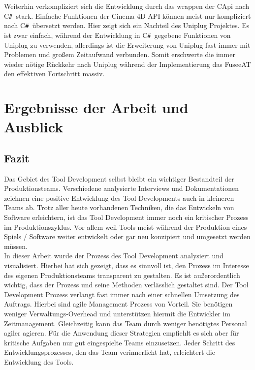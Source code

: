 \documentclass[pagesize, paper=a4, fontsize=12pt, titlepage=true, headings=small, headnosepline, abstractoff, liststotoc, nochapterprefix, plainheadsepline, twoside]{scrreprt}
\newcommand{\CSS}{C\texttt{\# }}
\newcommand{\CPP}{C\nolinebreak\hspace{-.05em}\raisebox{.4ex}{\tiny\bf +}\nolinebreak\hspace{-.10em}\raisebox{.4ex}{\tiny\bf +}}
\begin{document}
Weiterhin verkompliziert sich die Entwicklung durch das wrappen der \CPP Api nach \CSS stark. Einfache Funktionen der Cinema 4D API können meist nur kompliziert nach \CSS übersetzt werden. Hier zeigt sich ein Nachteil des Uniplug Projektes. Es ist zwar einfach, während der Entwicklung in \CSS gegebene Funktionen von Uniplug zu verwenden, allerdings ist die Erweiterung von Uniplug fast immer mit Problemen und großem Zeitaufwand verbunden. Somit erschwerte die immer wieder nötige Rückkehr nach Uniplug während der Implementierung das FuseeAT den effektiven Fortschritt massiv.




\chapter{Ergebnisse der Arbeit und Ausblick}

\section{Fazit}
Das Gebiet des Tool Development selbst bleibt ein wichtiger Bestandteil der Produktionsteams. Verschiedene analysierte Interviews und Dokumentationen zeichnen eine positive Entwicklung des Tool Developments auch in kleineren Teams ab. Trotz aller heute vorhandenen Techniken, die das Entwickeln von Software erleichtern, ist das Tool Development immer noch ein kritischer Prozess im Produktionszyklus. Vor allem weil Tools meist während der Produktion eines Spiels / Software weiter entwickelt oder gar neu konzipiert und umgesetzt werden müssen. \\

In dieser Arbeit wurde der Prozess des Tool Development analysiert und visualisiert. Hierbei hat sich gezeigt, dass es sinnvoll ist, den Prozess im Interesse des eigenen Produktionsteams transparent zu gestalten. Es ist außerordentlich wichtig, dass der Prozess und seine Methoden verlässlich gestaltet sind. Der Tool Development Prozess verlangt fast immer nach einer schnellen Umsetzung des Auftrags. Hierbei sind agile Management Prozess von Vorteil. Sie benötigen weniger Verwaltungs-Overhead und unterstützen hiermit die Entwickler im Zeitmanagement. Gleichzeitig kann das Team durch weniger benötigtes Personal agiler agieren. Für die Anwendung dieser Strategien empfiehlt es sich aber für kritische Aufgaben nur gut eingespielte Teams einzusetzen. Jeder Schritt des Entwicklungsprozesses, den das Team verinnerlicht hat, erleichtert die Entwicklung des Tools.\\
\end{document}
